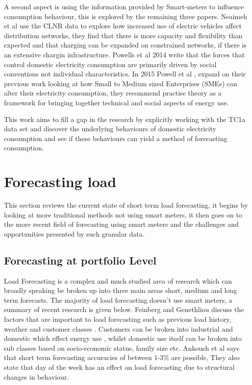 A second aspect is using the information provided by Smart-meters to influence consumption behaviour, this is explored by the remaining three papers. 
Neaimeh et al \cite{neaimeh2015} use the CLNR data to explore how increased use of electric vehicles affect distribution networks, they find that there is more capacity and flexibility than expected and that charging can be expanded on constrained networks, if there is an extensive chargin infrastructure. Powells et al 2014 \cite{powells2014} write that the forces that control domestic electricity consumption are primarily driven by social conventions not individual characteristics. In 2015 Powell et al \cite{powells2015}, expand on their previous work looking at how Small to Medium sized Enterprises (SMEs) can alter their electricity consumption, they recommend practise theory as a framework for bringing together technical and social aspects of energy use.

This work aims to fill a gap in the research by explicitly working with the TC1a data set and discover the underlying behaviours of domestic electricity consumption and see if these behaviours can yield a method of forecasting consumption.


\section{Forecasting load}
\label{lit:load}

This section reviews the current state of short term load forecasting, it begins by looking at more traditional methods not using smart meters, it then goes on to the more recent field of forecasting using smart meters and the challenges and opportunities presented by such granular data.

\subsection{Forecasting at portfolio Level}
Load Forecasting is a complex and much studied area of research which can broadly speaking be broken up into three main areas short, medium and long term forecasts. The majority of load forecasting doesn't use smart meters, a summary of recent research is given below. Feinberg and Genethliou \cite{feinberg} discuss the factors that are important to load forecasting such as previous load history, weather and customer classes \cite{Hussain2014}. Customers can be broken into industrial and domestic which effect energy use \cite{homesshowgreatestseasonalvariationinelectricityusetodayinenergyusenergyinformationadministrationeia2013}, whilst domestic use itself can be broken into sub classes based on socio-economic status, family size etc. Ankoush et al \cite{Ankush2015} says that short term forecasting accuracies of between 1-3\% are possible, They also state that day of the week has an effect on load forecasting due to structural changes in behaviour. 

